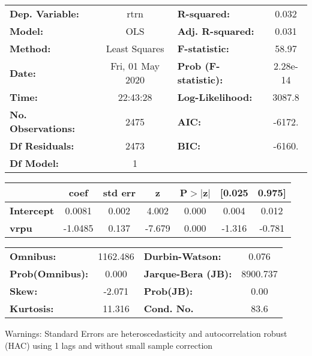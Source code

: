 \begin{center}
\begin{tabular}{lclc}
\toprule
\textbf{Dep. Variable:}    &       rtrn       & \textbf{  R-squared:         } &     0.032   \\
\textbf{Model:}            &       OLS        & \textbf{  Adj. R-squared:    } &     0.031   \\
\textbf{Method:}           &  Least Squares   & \textbf{  F-statistic:       } &     58.97   \\
\textbf{Date:}             & Fri, 01 May 2020 & \textbf{  Prob (F-statistic):} &  2.28e-14   \\
\textbf{Time:}             &     22:43:28     & \textbf{  Log-Likelihood:    } &    3087.8   \\
\textbf{No. Observations:} &        2475      & \textbf{  AIC:               } &    -6172.   \\
\textbf{Df Residuals:}     &        2473      & \textbf{  BIC:               } &    -6160.   \\
\textbf{Df Model:}         &           1      & \textbf{                     } &             \\
\bottomrule
\end{tabular}
\begin{tabular}{lcccccc}
                   & \textbf{coef} & \textbf{std err} & \textbf{z} & \textbf{P$> |$z$|$} & \textbf{[0.025} & \textbf{0.975]}  \\
\midrule
\textbf{Intercept} &       0.0081  &        0.002     &     4.002  &         0.000        &        0.004    &        0.012     \\
\textbf{vrpu}      &      -1.0485  &        0.137     &    -7.679  &         0.000        &       -1.316    &       -0.781     \\
\bottomrule
\end{tabular}
\begin{tabular}{lclc}
\textbf{Omnibus:}       & 1162.486 & \textbf{  Durbin-Watson:     } &    0.076  \\
\textbf{Prob(Omnibus):} &   0.000  & \textbf{  Jarque-Bera (JB):  } & 8900.737  \\
\textbf{Skew:}          &  -2.071  & \textbf{  Prob(JB):          } &     0.00  \\
\textbf{Kurtosis:}      &  11.316  & \textbf{  Cond. No.          } &     83.6  \\
\bottomrule
\end{tabular}
\end{center}

Warnings: \newline
 [1] Standard Errors are heteroscedasticity and autocorrelation robust (HAC) using 1 lags and without small sample correction